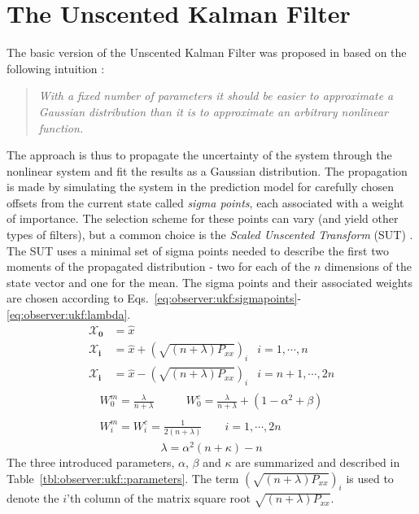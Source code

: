 \section{The Unscented Kalman Filter}
\label{sec:observer:ukf}
    The basic version of the Unscented Kalman Filter was proposed in \citep{Julier95anewapproach}
    based on the following intuition \citep{Julier95anewapproach}:
    \begin{quote}\textit{
        With a fixed number of parameters it should be easier to approximate a Gaussian
        distribution than it is to approximate an arbitrary nonlinear function.
        }
    \end{quote}
    The approach is thus to propagate the uncertainty of the system
    through the nonlinear system and fit the results as a Gaussian distribution.
    The propagation is made by simulating the system in the prediction
    model for carefully chosen offsets from the current state called
    \textit{sigma points}, each associated with a weight of importance.
    The selection scheme for these points can vary (and yield other
    types of filters), but a common choice
    is the \textit{Scaled Unscented Transform} (SUT) \citep{vandermerwe:upf}.
    The SUT uses a minimal set of sigma points needed to describe the
    first two moments of the propagated distribution - two for each
    of the $n$ dimensions of the state vector and one for the mean.
    The sigma points and their associated weights are chosen according to
    Eqs.~\ref{eq:observer:ukf:sigmapoints}-\ref{eq:observer:ukf:lambda}.
    \begin{align}\nonumber
        \mathbf{\mathcal{X}_{0}} &= \hat{x} & \\\nonumber
        \mathbf{\mathcal{X}_{i}} &= \hat{x} + \left( \sqrt{(n + \lambda) P_{xx}} \right)_{i}
            & i = 1,\cdots,n \\
        \mathbf{\mathcal{X}_{i}} &= \hat{x} - \left( \sqrt{(n + \lambda) P_{xx}} \right)_{i}
            & i = n+1,\cdots,2n
    \end{align}
    \begin{align}\nonumber
        \begin{array}{lr}
        W_{0}^{m} = \frac{\lambda}{n + \lambda} \qquad&
            W_{0}^{c} = \frac{\lambda}{n + \lambda} + (1-\alpha^{2} + \beta){}
        \end{array}\\
        \begin{array}{c}
            W^{m}_{i} =  W^{c}_{i} = \frac{1}{2(n + \lambda)} \qquad i = 1,\cdots,2n{}
        \end{array}
        \label{eq:observer:ukf:sigmapoints}
    \end{align}
    \begin{equation}
        \lambda = \alpha^{2}(n + \kappa) - n
    \end{equation}
    The three introduced parameters, $\alpha$, $\beta$ and $\kappa$
    are summarized and described in Table~\ref{tbl:observer:ukf::parameters}.
    The term $\left( \sqrt{(n + \lambda) P_{xx}} \right)_{i}$ is used to
    denote the $i$'th column of the matrix square root $\sqrt{(n + \lambda) P_{xx}}$.


